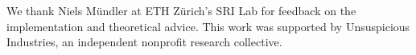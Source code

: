 \documentclass[11pt]{article}
\begin{document}
We thank Niels M\"undler at ETH Z\"urich's SRI Lab for feedback on the
implementation and theoretical advice. This work was supported by Unsuspicious
Industries, an independent nonprofit research collective.




\end{document}
